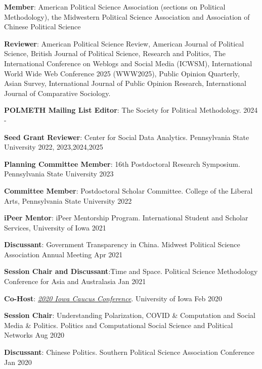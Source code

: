 \documentclass[10.5pt,]{article}
\providecommand{\tightlist}{%
	\setlength{\itemsep}{0pt}\setlength{\parskip}{0pt}}
\renewenvironment{itemize}{
	\begin{list}{}{
			\setlength{\leftmargin}{1.5em}
		}
	}{
	\end{list}
}
\begin{document}
\begin{itemize}
\tightlist
\item
  \textbf{Member}: American Political Science Association (sections on
  Political Methodology), the Midwestern Political Science Association
  and Association of Chinese Political Science
\item
  \textbf{Reviewer}: American Political Science Review, American Journal
  of Political Science, British Journal of Political Science, Research
  and Politics, The International Conference on Weblogs and Social Media
  (ICWSM), International World Wide Web Conference 2025 (WWW2025),
  Public Opinion Quarterly, Asian Survey, International Journal of
  Public Opinion Research, International Journal of Comparative
  Sociology.
\item
  \textbf{POLMETH Mailing List Editor}: The Society for Political
  Methodology. \hfill 2024 -
\item
  \textbf{Seed Grant Reviewer}: Center for Social Data Analytics.
  Pennsylvania State University \hfill 2022, 2023,2024,2025
\item
  \textbf{Planning Committee Member}: 16th Postdoctoral Research
  Symposium. Pennsylvania State University \hfill2023
\item
  \textbf{Committee Member}: Postdoctoral Scholar Committee. College of
  the Liberal Arts, Pennsylvania State University \hfill 2022
\item
  \textbf{iPeer Mentor}: iPeer Mentorship Program. International Student
  and Scholar Services, University of Iowa \hfill 2021
\item
  \textbf{Discussant}: Government Transparency in China. Midwest
  Political Science Association Annual Meeting \hfill Apr 2021
\item
  \textbf{Session Chair and Discussant}:Time and Space. Political
  Science Methodology Conference for Asia and Australasia \hfill  Jan
  2021
\item
  \textbf{Co-Host}:
  \href{https://clas.uiowa.edu/polisci/Shambaugh-2020Caucus}{\emph{2020
  Iowa Caucus Conference}}. University of Iowa \hfill Feb 2020
\item
  \textbf{Session Chair}: Understanding Polarization, COVID \&
  Computation and Social Media \& Politics. Politics and Computational
  Social Science and Political Networks \hfill Aug 2020
\item
  \textbf{Discussant}: Chinese Politics. Southern Political Science
  Association Conference \hfill Jan 2020
\end{itemize}
\end{document}
